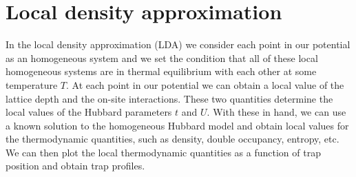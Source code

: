\documentclass[11pt,letter]{article}
\begin{document}
%
%


\section{ Local density approximation }
\label{sec:lda}

In the local density approximation (LDA) we consider each point in our
potential as an homogeneous system and we set the condition that all of these
local homogeneous systems are in thermal equilibrium with each other  at some
temperature $T$.   At each point in our potential we can obtain a local value
of the lattice depth and the on-site interactions. These two quantities
determine the local values of the Hubbard parameters $t$ and $U$.  With these
in hand, we can use a known solution to the homogeneous Hubbard model and
obtain local values for the thermodynamic quantities, such as density, double
occupancy, entropy, etc.   We can then plot the local thermodynamic quantities
as a function of trap position and obtain trap profiles.   
\end{document}
